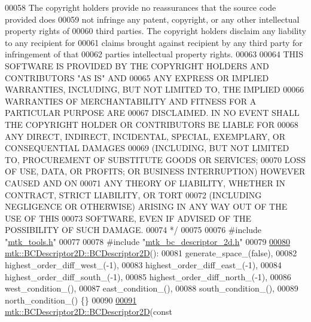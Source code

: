 \begin{DoxyCode}
00058 \textcolor{comment}{The copyright holders provide no reassurances that the source code provided does}
00059 \textcolor{comment}{not infringe any patent, copyright, or any other intellectual property rights of}
00060 \textcolor{comment}{third parties. The copyright holders disclaim any liability to any recipient for}
00061 \textcolor{comment}{claims brought against recipient by any third party for infringement of that}
00062 \textcolor{comment}{parties intellectual property rights.}
00063 \textcolor{comment}{}
00064 \textcolor{comment}{THIS SOFTWARE IS PROVIDED BY THE COPYRIGHT HOLDERS AND CONTRIBUTORS "AS IS" AND}
00065 \textcolor{comment}{ANY EXPRESS OR IMPLIED WARRANTIES, INCLUDING, BUT NOT LIMITED TO, THE IMPLIED}
00066 \textcolor{comment}{WARRANTIES OF MERCHANTABILITY AND FITNESS FOR A PARTICULAR PURPOSE ARE}
00067 \textcolor{comment}{DISCLAIMED. IN NO EVENT SHALL THE COPYRIGHT HOLDER OR CONTRIBUTORS BE LIABLE FOR}
00068 \textcolor{comment}{ANY DIRECT, INDIRECT, INCIDENTAL, SPECIAL, EXEMPLARY, OR CONSEQUENTIAL DAMAGES}
00069 \textcolor{comment}{(INCLUDING, BUT NOT LIMITED TO, PROCUREMENT OF SUBSTITUTE GOODS OR SERVICES;}
00070 \textcolor{comment}{LOSS OF USE, DATA, OR PROFITS; OR BUSINESS INTERRUPTION) HOWEVER CAUSED AND ON}
00071 \textcolor{comment}{ANY THEORY OF LIABILITY, WHETHER IN CONTRACT, STRICT LIABILITY, OR TORT}
00072 \textcolor{comment}{(INCLUDING NEGLIGENCE OR OTHERWISE) ARISING IN ANY WAY OUT OF THE USE OF THIS}
00073 \textcolor{comment}{SOFTWARE, EVEN IF ADVISED OF THE POSSIBILITY OF SUCH DAMAGE.}
00074 \textcolor{comment}{*/}
00075 
00076 \textcolor{preprocessor}{#include "\hyperlink{mtk__tools_8h}{mtk\_tools.h}"}
00077 
00078 \textcolor{preprocessor}{#include "\hyperlink{mtk__bc__descriptor__2d_8h}{mtk\_bc\_descriptor\_2d.h}"}
00079 
\hypertarget{mtk__bc__descriptor__2d_8cc_source_l00080}{}\hyperlink{classmtk_1_1BCDescriptor2D_abbc3af29202dbfef203f4cafd9566fd0}{00080} \hyperlink{classmtk_1_1BCDescriptor2D_abbc3af29202dbfef203f4cafd9566fd0}{mtk::BCDescriptor2D::BCDescriptor2D}():
00081   generate\_space\_(false),
00082   highest\_order\_diff\_west\_(-1),
00083   highest\_order\_diff\_east\_(-1),
00084   highest\_order\_diff\_south\_(-1),
00085   highest\_order\_diff\_north\_(-1),
00086   west\_condition\_(),
00087   east\_condition\_(),
00088   south\_condition\_(),
00089   north\_condition\_() \{\}
00090 
\hypertarget{mtk__bc__descriptor__2d_8cc_source_l00091}{}\hyperlink{classmtk_1_1BCDescriptor2D_ae8a93352a94efed52747b710e6ff7893}{00091} \hyperlink{classmtk_1_1BCDescriptor2D_abbc3af29202dbfef203f4cafd9566fd0}{mtk::BCDescriptor2D::BCDescriptor2D}(\textcolor{keyword}{const} 

\end{DoxyCode}
